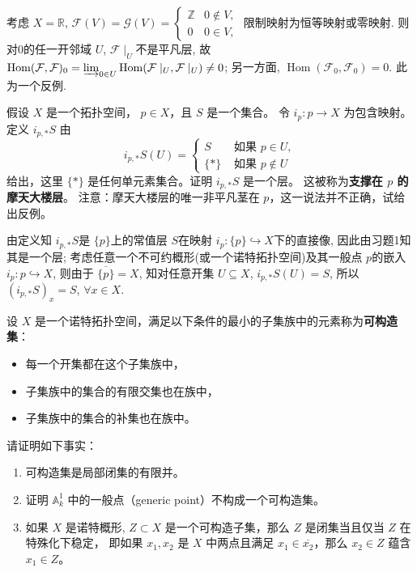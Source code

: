 \begin{proofc}
    考虑 $X=\mathbb{R}$, 
    $\mathcal{F}(V)=\mathcal{G}(V)=\begin{cases} \mathbb{Z} & 0 \notin V, \\ 0 & 0 \in V, \end{cases}$ 
    限制映射为恒等映射或零映射. 
    则对$0$的任一开邻域 $U$, $\mathcal{F}\mid _{U}$不是平凡层, 
    故 $\operatorname{Hom}(\mathcal{F},\mathcal{F})_{0}=\varinjlim_{0 \in U}\operatorname{Hom}(\mathcal{F}\mid _{U}, \mathcal{F}\mid _{U})\neq 0$; 
    另一方面, $\operatorname{Hom}(\mathcal{F}_{0},\mathcal{F}_{0})=0$. 此为一个反例.
\end{proofc}

\begin{exercise}[摩天大楼层]
    假设 $X$ 是一个拓扑空间， $p \in X$，且 $S$ 是一个集合。
    令 $i_{p}: p \rightarrow X$ 为包含映射。定义 $i_{p, *} S$ 由
    $$
        i_{p, *} S(U)= \begin{cases}S & \text { 如果 } p \in U, \\ \{*\} & \text { 如果 } p \notin U\end{cases}
    $$
    给出，这里 $\{*\}$ 是任何单元素集合。证明 $i_{p, *} S$ 是一个层。
    这被称为\textbf{支撑在 $p$ 的摩天大楼层}。
    注意：摩天大楼层的唯一非平凡茎在 $p$，这一说法并不正确，试给出反例。
\end{exercise}

\begin{proofc}
    由定义知 $i_{p,*}S$是 $\{ p \}$上的常值层 $S$在映射 $i_{p}:\{ p \}\hookrightarrow X$下的直接像, 
    因此由习题1知其是一个层; 
    考虑任意一个不可约概形(或一个诺特拓扑空间)及其一般点 $p$的嵌入 $i_{p}:p \hookrightarrow X$, 
    则由于 $\overline{\{ p \}}=X$, 知对任意开集 $U \subseteq X$, $i_{p,*}S(U)=S$, 
    所以 $(i_{p,*}S)_{x}=S$, $\forall x \in X$.
\end{proofc}

\begin{exercise}[可构造集]
    设 $X$ 是一个诺特拓扑空间，满足以下条件的最小的子集族中的元素称为\textbf{可构造集}：

    \begin{itemize}
        \item 每一个开集都在这个子集族中，
        \item 子集族中的集合的有限交集也在族中，
        \item 子集族中的集合的补集也在族中。
    \end{itemize}

    请证明如下事实：

    \begin{enumerate}
        \item 可构造集是局部闭集的有限并。
        \item 证明 $\mathbb{A}_{k}^{1}$ 中的一般点（generic point）不构成一个可构造集。
        \item 如果 $X$ 是诺特概形, $Z \subset X$ 是一个可构造子集，那么 $Z$ 是闭集当且仅当 $Z$ 在特殊化下稳定，
        即如果 $x_{1}, x_{2}$ 是 $X$ 中两点且满足 $x_{1} \in \overline{x_{2}}$，那么 $x_{2} \in Z$ 蕴含 $x_{1} \in Z$。
    \end{enumerate}
\end{exercise}


